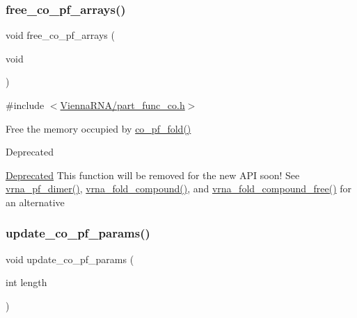 \subsubsection{\texorpdfstring{free\+\_\+co\+\_\+pf\+\_\+arrays()}{free\_co\_pf\_arrays()}}
{\footnotesize\ttfamily void free\+\_\+co\+\_\+pf\+\_\+arrays (\begin{DoxyParamCaption}\item[{void}]{ }\end{DoxyParamCaption})}



{\ttfamily \#include $<$\hyperlink{part__func__co_8h}{Vienna\+R\+N\+A/part\+\_\+func\+\_\+co.\+h}$>$}



Free the memory occupied by \hyperlink{group__part__func__global__deprecated_gae5c1e7331718669bdae7a86de2be6184}{co\+\_\+pf\+\_\+fold()} 

\begin{DoxyRefDesc}{Deprecated}
\item[\hyperlink{deprecated__deprecated000116}{Deprecated}]This function will be removed for the new A\+PI soon! See \hyperlink{group__part__func__global_ga4e5c7d06c302a7c59fc0d64dc142ca63}{vrna\+\_\+pf\+\_\+dimer()}, \hyperlink{group__fold__compound_ga6601d994ba32b11511b36f68b08403be}{vrna\+\_\+fold\+\_\+compound()}, and \hyperlink{group__fold__compound_ga576a077b418a9c3650e06f8e5d296fc2}{vrna\+\_\+fold\+\_\+compound\+\_\+free()} for an alternative\end{DoxyRefDesc}
\mbox{\label{group__part__func__global__deprecated_ga6e0f36c1f9b7d9dd4bfbad914c1119e5}} 
\subsubsection{\texorpdfstring{update\+\_\+co\+\_\+pf\+\_\+params()}{update\_co\_pf\_params()}}
{\footnotesize\ttfamily void update\+\_\+co\+\_\+pf\+\_\+params (\begin{DoxyParamCaption}\item[{int}]{length }\end{DoxyParamCaption})}



